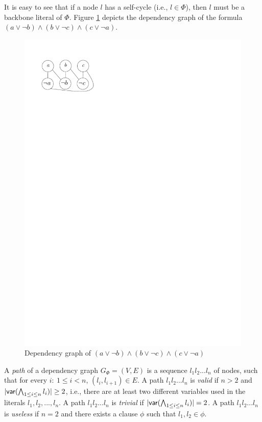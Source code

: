 It is easy to see that if a node $l$ has a self-cycle (i.e., $l\in\Phi$), then $l$ must be a backbone literal of $\Phi$.
Figure \ref{fig:depend} depicts the dependency graph of the formula $(a\vee\neg b)\wedge(b\vee\neg c)\wedge(c\vee\neg a)$.
 \begin{figure}
    \centering
    \includegraphics[scale=0.7]{dependency.pdf}
   \caption{Dependency graph of $(a\vee\neg b)\wedge(b\vee\neg c)\wedge(c\vee\neg a)$}
   \label{fig:depend}
\end{figure}

A \emph{path} of a dependency graph  $G_\Phi=(V,E)$ is a sequence $l_1l_2...l_n$ of nodes, such that for every $i:\ 1\leq i<n$, $(l_i,l_{i+1})\in E$.
A path $l_1l_2...l_n$ is \emph{valid} if $n>2$ and $|\textsf{var}(\bigwedge_{1\leq i\leq n} l_i)|\geq 2$, i.e., there are at least two different variables used in 
the literals  $l_1,l_2,...,l_n$. A path $l_1l_2...l_n$ is \emph{trivial} if $|\textsf{var}(\bigwedge_{1\leq i\leq n} l_i)|=2$.
A path $l_1l_2...l_n$ is \emph{useless} if $n=2$ and there exists a clause $\phi$ such that $l_1,l_2\in\phi$.

